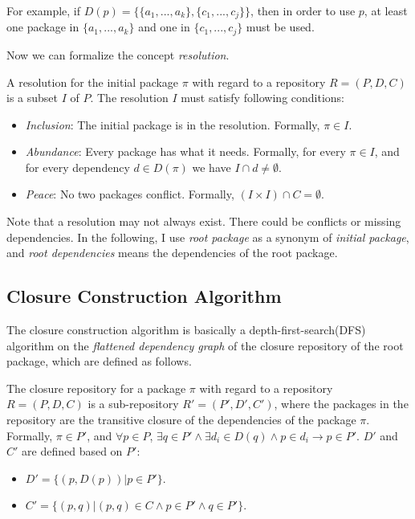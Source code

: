 For example, if $D(p) = \{\{a_1, ..., a_k\}, \{c_1, ..., c_j\}\}$, then in order to use $p$, at least one package in $\{a_1, ..., a_k\}$ and one in $\{c_1, ..., c_j\}$ must be used.

Now we can formalize the concept \emph{resolution}.

\begin{definition}[Resolution]
  A resolution for the initial package $\pi$ with regard to a repository $R = (P, D, C)$ is a subset $I$ of $P$. The resolution $I$ must satisfy following conditions:

  \begin{itemize}
  \item \emph{Inclusion}: The initial package is in the resolution. Formally, $\pi \in I$.
  \item \emph{Abundance}: Every package has what it needs. Formally, for every $\pi \in I$, and for every dependency $d \in D(\pi)$ we have $I \cap d \neq \emptyset$.
  \item \emph{Peace}: No two packages conflict. Formally, $(I \times I) \cap C = \emptyset$.
  \end{itemize}
\end{definition}

Note that a resolution may not always exist. There could be conflicts or missing dependencies. In the following, I use \emph{root package} as a synonym of \emph{initial package}, and \emph{root dependencies} means the dependencies of the root package.

\subsection{Closure Construction Algorithm}

The closure construction algorithm is basically a depth-first-search(DFS) algorithm on the \emph{flattened dependency graph} of the closure repository of the root package, which are defined as follows.

\begin{definition}
  The closure repository for a package $\pi$ with regard to a repository $R = (P, D, C)$ is a sub-repository $R' = (P', D', C')$, where the packages in the repository are the transitive closure of the dependencies of the package $\pi$. Formally, $\pi \in P'$, and $\forall p \in P$, $\exists q \in P'\land \exists d_i \in D(q) \land p \in d_i \rightarrow p \in P'$. $D'$ and $C'$ are defined based on $P'$:

  \begin{itemize}
  \item $D' = \{ (p, D(p)) | p \in P' \}$.
  \item $C' = \{ (p, q) | (p, q) \in C \land p \in P' \land q \in P' \}$.
  \end{itemize}
\end{definition}

